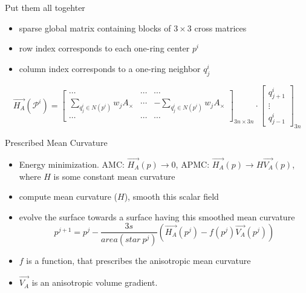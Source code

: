 \documentclass{beamer}
\begin{document}
\begin{frame}{Put them all togehter}
\begin{itemize}
\item sparse global matrix containing blocks of $3 \times 3$ cross matrices
\item row index corresponds to each one-ring center $p^i$
\item column index corresponds to a one-ring neighbor $q^i_j$
\end{itemize}
\begin{equation*}
\vec{H_A}( \mathcal{P}^i ) = 
\begin{bmatrix} 
 \cdots & \cdots & \cdots \\
 \sum\limits_{q_j^i \in N(p^i)}{w_j A_{\times}} & \cdots & -\sum\limits_{q_j^i \in N(p^i)}{w_j A_{\times}} \\
 \cdots & \cdots & \cdots 
\end{bmatrix}_{3n \times 3n} \cdot
\left[ \begin{array}{c} 
q^i_{j+1} \\ 
\vdots \\ 
q^i_{j-1} \end{array} \right]_{3n}
\end{equation*}
\end{frame}

\begin{frame}{Prescribed Mean Curvature}
\begin{itemize}
\item Energy minimization. AMC: $\vec{H_A}(p) \rightarrow 0$, APMC: $\vec{H_A}(p) \rightarrow H\vec{V_A}(p)$, where $H$ is some constant mean curvature
\item compute mean curvature ($H$), smooth this scalar field
\item evolve the surface towards a surface having this smoothed mean curvature
\begin{equation*}
p^{j+1} = p^{j} - \dfrac{3s}{area(star\ p^j)}(\vec{H_A}(p^j) - f(p^j)\vec{V_A}(p^j))
\end{equation*}
\item $f$ is a function, that prescribes the anisotropic mean curvature
\item $\vec{V_A}$ is an anisotropic volume gradient.
\end{itemize}
\end{frame}

\end{document}
